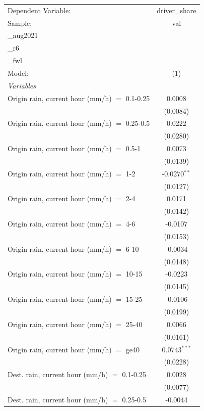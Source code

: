 \ifdefined\ifclassloaded
{}
\fi
\begingroup
\centering
\begin{tabular}{lc}
   \tabularnewline \midrule \midrule
   Dependent Variable: & driver\_share\\
   Sample: & val\\_aug2021\\_r6\\_fwl \\
   Model: & (1)\\
   \midrule
   \emph{Variables}\\
   Origin rain, current hour (mm/h) $=$ 0.1-0.25 & 0.0008\\
    & (0.0084)\\
   Origin rain, current hour (mm/h) $=$ 0.25-0.5 & 0.0222\\
    & (0.0280)\\
   Origin rain, current hour (mm/h) $=$ 0.5-1 & 0.0073\\
    & (0.0139)\\
   Origin rain, current hour (mm/h) $=$ 1-2 & -0.0270$^{**}$\\
    & (0.0127)\\
   Origin rain, current hour (mm/h) $=$ 2-4 & 0.0171\\
    & (0.0142)\\
   Origin rain, current hour (mm/h) $=$ 4-6 & -0.0107\\
    & (0.0153)\\
   Origin rain, current hour (mm/h) $=$ 6-10 & -0.0034\\
    & (0.0148)\\
   Origin rain, current hour (mm/h) $=$ 10-15 & -0.0223\\
    & (0.0145)\\
   Origin rain, current hour (mm/h) $=$ 15-25 & -0.0106\\
    & (0.0199)\\
   Origin rain, current hour (mm/h) $=$ 25-40 & 0.0066\\
    & (0.0161)\\
   Origin rain, current hour (mm/h) $=$ ge40 & 0.0743$^{***}$\\
    & (0.0228)\\
   Dest. rain, current hour (mm/h) $=$ 0.1-0.25 & 0.0028\\
    & (0.0077)\\
   Dest. rain, current hour (mm/h) $=$ 0.25-0.5 & -0.0044\\

\end{tabular}
